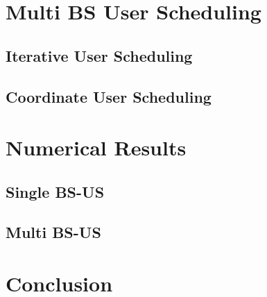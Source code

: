 \documentclass[a4paper,11pt,draft,fleqn,onecolumn]{report}
\begin{document}
\section{Multi BS User Scheduling}

\subsection{Iterative User Scheduling}

\subsection{Coordinate User Scheduling}

\section{Numerical Results}

\subsection{Single BS-US}

\subsection{Multi BS-US}

\section{Conclusion}



\end{document}
